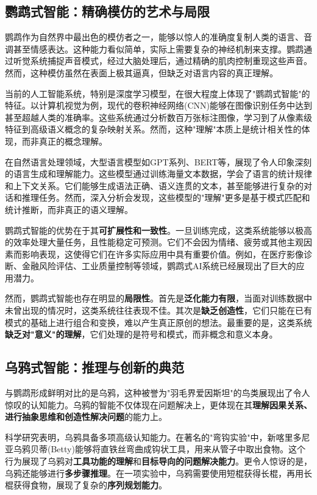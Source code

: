 \subsection*{鹦鹉式智能：精确模仿的艺术与局限}

鹦鹉作为自然界中最出色的模仿者之一，能够以惊人的准确度复制人类的语言、音调甚至情感表达。这种能力看似简单，实际上需要复杂的神经机制来支撑。鹦鹉通过听觉系统捕捉声音模式，经过大脑处理后，通过精确的肌肉控制重现这些声音。然而，这种模仿虽然在表面上极其逼真，但缺乏对语言内容的真正理解。

当前的人工智能系统，特别是深度学习模型，在很大程度上体现了"鹦鹉式智能"的特征。以计算机视觉为例，现代的卷积神经网络(CNN)能够在图像识别任务中达到甚至超越人类的准确率。这些系统通过分析数百万张标注图像，学习到了从像素级特征到高级语义概念的复杂映射关系。然而，这种"理解"本质上是统计相关性的体现，而非真正的概念理解。

在自然语言处理领域，大型语言模型如GPT系列、BERT等，展现了令人印象深刻的语言生成和理解能力。这些模型通过训练海量文本数据，学会了语言的统计规律和上下文关系。它们能够生成语法正确、语义连贯的文本，甚至能够进行复杂的对话和推理任务。然而，深入分析会发现，这些模型的"理解"更多是基于模式匹配和统计推断，而非真正的语义理解。

鹦鹉式智能的优势在于其\textbf{可扩展性和一致性}。一旦训练完成，这类系统能够以极高的效率处理大量任务，且性能稳定可预测。它们不会因为情绪、疲劳或其他主观因素而影响表现，这使得它们在许多实际应用中具有重要价值。例如，在医疗影像诊断、金融风险评估、工业质量控制等领域，鹦鹉式AI系统已经展现出了巨大的应用潜力。

然而，鹦鹉式智能也存在明显的\textbf{局限性}。首先是\textbf{泛化能力有限}，当面对训练数据中未曾出现的情况时，这类系统往往表现不佳。其次是\textbf{缺乏创造性}，它们只能在已有模式的基础上进行组合和变换，难以产生真正原创的想法。最重要的是，这类系统\textbf{缺乏对"意义"的理解}，它们处理的是符号和模式，而非概念和意义本身。

\subsection*{乌鸦式智能：推理与创新的典范}

与鹦鹉形成鲜明对比的是乌鸦，这种被誉为"羽毛界爱因斯坦"的鸟类展现出了令人惊叹的认知能力。乌鸦的智能不仅体现在问题解决上，更体现在其\textbf{理解因果关系、进行抽象思维和创造性解决问题}的能力上。

科学研究表明，乌鸦具备多项高级认知能力。在著名的"弯钩实验"中，新喀里多尼亚乌鸦贝蒂(Betty)能够将直铁丝弯曲成钩状工具，用来从管子中取出食物。这个行为展现了乌鸦对\textbf{工具功能的理解}和\textbf{目标导向的问题解决能力}。更令人惊讶的是，乌鸦还能够进行\textbf{多步骤推理}。在一项实验中，乌鸦需要使用短棍获得长棍，再用长棍获得食物，展现了复杂的\textbf{序列规划能力}。


